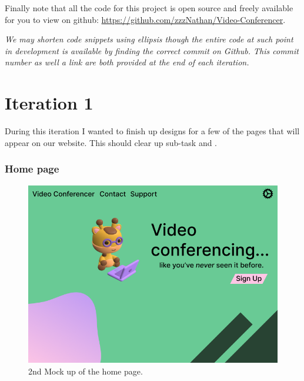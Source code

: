 Finally note that all the code for this project is open source
and freely available for you to view on github:
\url{https://github.com/zzzNathan/Video-Conferencer}. \\ \vspace{0.2cm}

\textit{We may shorten code snippets using ellipsis though the
entire code at such point in development is available by finding the 
correct commit on Github. This commit number as well a link are both
provided at the end of each iteration.}

\section{Iteration 1}


During this iteration I wanted to finish up designs for a few 
of the pages that will appear on our website. This should 
clear up sub-task  and .

\subsubsection{Home page}

\begin{figure}[H]
\centering

\includegraphics[scale=0.2]{Images/HomeUI_2.png}

\caption{2nd Mock up of the home page.}
\label{fig:ui2}
\end{figure}

